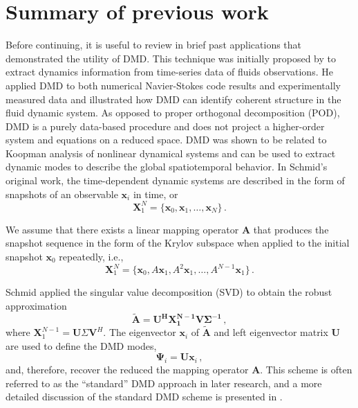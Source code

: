 \section{Summary of previous work}
Before continuing, it is useful to review in brief past applications that demonstrated the utility of DMD.
This technique was initially proposed by \citet{schmid_dynamic_2010}\cite{schmid_applications_2011} to extract dynamics information from time-series data of fluids observations.
He applied DMD to both numerical Navier-Stokes code results and experimentally measured data and illustrated how DMD can identify coherent structure in the fluid dynamic system.
As opposed to proper orthogonal decomposition (POD)\cite{lumley2007stochastic}, DMD is a purely data-based procedure and does not project a higher-order system and equations on a reduced space. 
DMD was shown to be related to Koopman analysis\cite{lasota2013chaos,mezic2005spectral} of nonlinear dynamical systems and can be used to extract dynamic modes to describe the global spatiotemporal behavior.
In Schmid's original work, the time-dependent dynamic systems are described in the form of snapshots of an observable $\mathbf{x}_i$ in time, or
\begin{equation}
 \mathbf{X}^{N}_1 = \{\mathbf{x}_0, \mathbf{x}_1, \ldots, \mathbf{x}_{N} \} \, .
 \label{eq:snap_matrix}
\end{equation}

We assume that there exists a linear mapping operator $\mathbf{A}$ that produces the snapshot sequence  in the form of the Krylov subspace when applied to the initial snapshot $\mathbf{x}_0$ repeatedly, i.e., 
\begin{equation}
 \mathbf{X}^{N}_1 = \{\mathbf{x}_0,A\mathbf{x}_1,A^2\mathbf{x}_1,…,A^{N-1}\mathbf{x}_1 \} \, .
 \label{eq:Krylov_seq}
\end{equation}

Schmid applied the singular value decomposition (SVD) to obtain the robust approximation
\begin{equation}
\mathbf{\tilde{A}} = \mathbf{U^H X_1^{N-1}V\Sigma^{-1}} \, ,
 \label{eq:stanard_DMD}
\end{equation}
where $\mathbf{X}_1^{N-1} = \mathbf{U}\Sigma \mathbf{V}^H$. 
The eigenvector $\mathbf{x}_i$ of $\mathbf{\tilde{A}}$ and left eigenvector matrix $\mathbf{U}$ are used to define the DMD modes, 
\begin{equation}
\mathbf{\mathbf{\Psi}}_i = \mathbf{U} \mathbf{x}_i \, ,
 \label{eq:dyanmic_modes}
\end{equation}
and, therefore, recover the reduced the mapping operator $\mathbf{A}$.
This scheme is often referred to as the ``standard'' DMD approach in later research\cite{tu_dynamic_2014}, and a more detailed discussion of the standard DMD scheme is presented in .   

